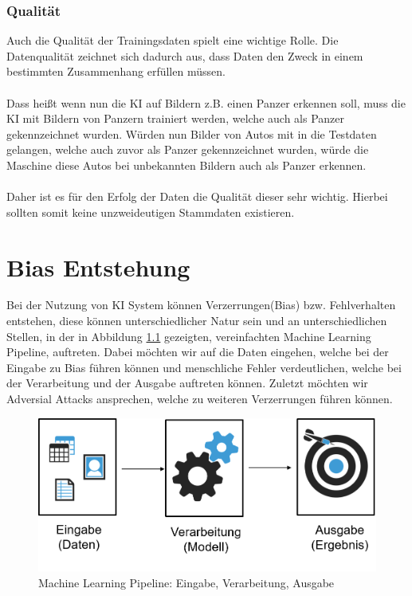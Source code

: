 \documentclass[12pt,oneside,a4paper,parskip]{scrbook}
\begin{document}
\subsection{Qualität}
\label{section:DataQuality}
Auch die Qualität der Trainingsdaten spielt eine wichtige Rolle. Die Datenqualität zeichnet sich dadurch aus, dass Daten den Zweck in einem bestimmten Zusammenhang erfüllen müssen. 
\\\\
Dass heißt wenn nun die KI auf Bildern z.B. einen Panzer erkennen soll\cite{panzer}, muss die KI mit Bildern von Panzern trainiert werden, welche auch als Panzer gekennzeichnet wurden.
Würden nun Bilder von Autos mit in die Testdaten gelangen, welche auch zuvor als Panzer gekennzeichnet wurden, würde die Maschine diese Autos bei unbekannten Bildern auch als Panzer erkennen.
\\\\
Daher ist es für den Erfolg der Daten die Qualität dieser sehr wichtig. Hierbei sollten somit keine unzweideutigen Stammdaten existieren.


\chapter{Bias Entstehung}
Bei der Nutzung von KI System können Verzerrungen(Bias) bzw. Fehlverhalten entstehen, diese können unterschiedlicher Natur sein und an unterschiedlichen Stellen, in der in Abbildung \ref{fig:dataBias} gezeigten, vereinfachten Machine Learning Pipeline, auftreten. Dabei möchten wir auf die Daten eingehen, welche bei der Eingabe zu Bias führen können und menschliche Fehler verdeutlichen, welche bei der Verarbeitung und der Ausgabe auftreten können. Zuletzt möchten wir Adversial Attacks ansprechen, welche zu weiteren Verzerrungen führen können.

\begin{figure}[h]
	\begin{center}
		\includegraphics[width=12cm]{Bilder/data_bias.png}
		\caption{Machine Learning Pipeline: Eingabe, Verarbeitung, Ausgabe}
		\label{fig:dataBias}
	\end{center}
\end{figure}
\end{document}
